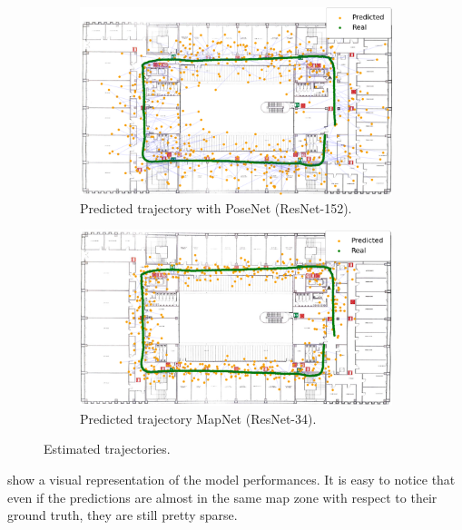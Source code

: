 \begin{figure}[htbp]
    \begin{subfigure}[b]{0.48\textwidth}
        \centering
        \includegraphics[width=1\textwidth]{./imgs/posenet_map.png}
        \caption{Predicted trajectory with PoseNet (ResNet-152).}
        \label{fig:trajectory-posenet}
    \end{subfigure}
    \hfill
    \begin{subfigure}[b]{0.48\textwidth}
        \includegraphics[width=1\textwidth]{./imgs/mapnet_map.png}
        \caption{Predicted trajectory MapNet (ResNet-34).}
        \label{fig:trajectory-mapnet}
    \end{subfigure}
    \caption{Estimated trajectories.}
\end{figure}
 show a visual representation of the model performances. It is easy to notice that even if the predictions are almost in the same map zone with respect to their ground truth, they are still pretty sparse.

